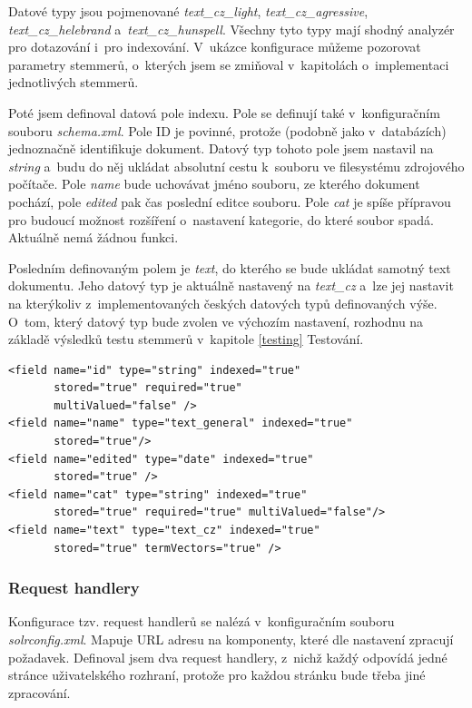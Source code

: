 Datové typy jsou pojmenované \emph{text\_cz\_light}, \emph{text\_cz\_agressive}, \\ \emph{text\_cz\_helebrand} a~\emph{text\_cz\_hunspell}. Všechny tyto typy mají shodný analyzér pro dotazování i~pro indexování. V~ukázce konfigurace můžeme pozorovat parametry stemmerů, o~kterých jsem se zmiňoval v~kapitolách o~implementaci jednotlivých stemmerů.

Poté jsem definoval datová pole indexu. Pole se definují také v~konfiguračním souboru \emph{schema.xml}. Pole ID je povinné, protože (podobně jako v~databázích) jednoznačně identifikuje dokument. Datový typ tohoto pole jsem nastavil na \emph{string} a~budu do něj ukládat absolutní cestu k~souboru ve filesystému zdrojového počítače. Pole \emph{name} bude uchovávat jméno souboru, ze kterého dokument pochází, pole \emph{edited} pak čas poslední editce souboru. Pole \emph{cat} je spíše přípravou pro budoucí možnost rozšíření o~nastavení kategorie, do které soubor spadá. Aktuálně nemá žádnou funkci.

Posledním definovaným polem je \emph{text}, do kterého se bude ukládat samotný text dokumentu. Jeho datový typ je aktuálně nastavený na \emph{text\_cz} a~lze jej nastavit na kterýkoliv z~implementovaných českých datových typů definovaných výše. O~tom, který datový typ bude zvolen ve výchozím nastavení, rozhodnu na základě výsledků testu stemmerů v~kapitole \ref{testing} Testování. 

\begin{verbatim}
<field name="id" type="string" indexed="true" 
       stored="true" required="true" 
       multiValued="false" /> 
<field name="name" type="text_general" indexed="true" 
       stored="true"/>
<field name="edited" type="date" indexed="true" 
       stored="true" />
<field name="cat" type="string" indexed="true" 
       stored="true" required="true" multiValued="false"/>
<field name="text" type="text_cz" indexed="true" 
       stored="true" termVectors="true" />
\end{verbatim}

\subsubsection{Request handlery}
Konfigurace tzv. request handlerů se nalézá v~konfiguračním souboru \emph{solrconfig.xml}. Mapuje URL adresu na komponenty, které dle nastavení zpracují požadavek. Definoval jsem dva request handlery, z~nichž každý odpovídá jedné stránce uživatelského rozhraní, protože pro každou stránku bude třeba jiné zpracování. 

